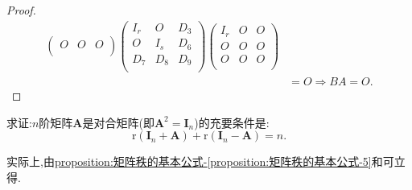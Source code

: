 \documentclass[../../main.tex]{subfiles}%
\begin{document}
\begin{proof}
\begin{align*}
\begin{pmatrix}
O&	O&	O\\
\end{pmatrix} \begin{pmatrix}
I_r&	O&	D_3\\
O&	I_s&	D_6\\
D_7&	D_8&	D_9\\
\end{pmatrix} \begin{pmatrix}
I_r&	O&	O\\
O&	O&	O\\
O&	O&	O\\
\end{pmatrix}\\
&=O\Longrightarrow BA=O.
\end{align*}
\end{proof}

\begin{proposition}[对合矩阵关于秩的判定准则]\label{proposition:对合矩阵关于秩的判定准则}
求证:\(n\)阶矩阵\(\boldsymbol{A}\)是对合矩阵(即\(\boldsymbol{A}^2 = \boldsymbol{I}_n\))的充要条件是:
\[
\mathrm{r}(\boldsymbol{I}_n+\boldsymbol{A})+\mathrm{r}(\boldsymbol{I}_n - \boldsymbol{A}) = n.
\]
\end{proposition}
\begin{note}
实际上,由\hyperref[proposition:矩阵秩的基本公式-5]{proposition:矩阵秩的基本公式-\ref{proposition:矩阵秩的基本公式-5}}和可立得.
\end{note}
\end{document}

